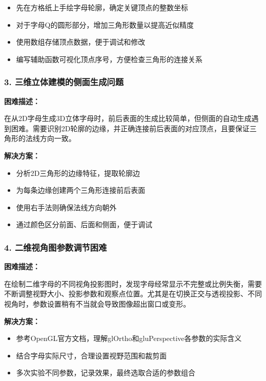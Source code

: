 \documentclass[a4paper]{article}
\begin{document}
\begin{itemize}
    \item 先在方格纸上手绘字母轮廓，确定关键顶点的整数坐标
    \item 对于字母Q的圆形部分，增加三角形数量以提高近似精度
    \item 使用数组存储顶点数据，便于调试和修改
    \item 编写辅助函数可视化顶点序号，方便检查三角形的连接关系
\end{itemize}

\subsubsection{3. 三维立体建模的侧面生成问题}

\textbf{困难描述：}

在从2D字母生成3D立体字母时，前后表面的生成比较简单，但侧面的自动生成遇到困难。需要识别2D轮廓的边缘，并正确连接前后表面的对应顶点，且要保证三角形的法线方向一致。

\textbf{解决方案：}

\begin{itemize}
    \item 分析2D三角形的边缘特征，提取轮廓边
    \item 为每条边缘创建两个三角形连接前后表面
    \item 使用右手法则确保法线方向朝外
    \item 通过颜色区分前面、后面和侧面，便于调试
\end{itemize}

\subsubsection{4. 二维视角图参数调节困难}

\textbf{困难描述：}

在绘制二维字母的不同视角投影图时，发现字母经常显示不完整或比例失衡，需要不断调整视野大小、投影参数和观察点位置。尤其是在切换正交与透视投影、不同视角时，参数设置稍有不当就会导致图像超出窗口或变形。

\textbf{解决方案：}

\begin{itemize}
    \item 参考OpenGL官方文档，理解glOrtho和gluPerspective各参数的实际含义
    \item 结合字母实际尺寸，合理设置视野范围和裁剪面
    \item 多次实验不同参数，记录效果，最终选取合适的参数组合
\end{itemize}
\end{document}
